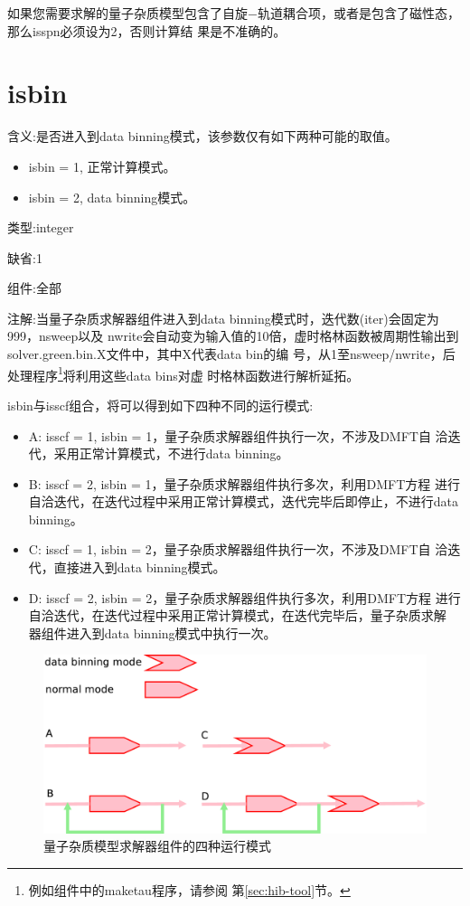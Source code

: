 如果您需要求解的量子杂质模型包含了自旋$-$轨道耦合项，或者是包含了磁性态，那么isspn必须设为2，否则计算结
果是不准确的。

\section{isbin }
\label{sec:isbin}

{\color{red}含义}:是否进入到data binning模式，该参数仅有如下两种可能的取值。
\begin{itemize}
\item isbin = 1, 正常计算模式。
\item isbin = 2, data binning模式。
\end{itemize}

{\color{green}类型}:integer

{\color{blue}缺省}:1

{\color{brown}组件}:全部

{\color{purple}注解}:当量子杂质求解器组件进入到data binning模式时，迭代数(iter)会固定为999，nsweep以及
nwrite会自动变为输入值的10倍，虚时格林函数被周期性输出到solver.green.bin.X文件中，其中X代表data bin的编
号，从1至nsweep/nwrite，后处理程序\footnote{例如{\hibiscus}组件中的maketau程序，请参阅
第\ref{sec:hib-tool}节。}将利用这些data bins对虚
时格林函数进行解析延拓。

isbin与isscf组合，将可以得到如下四种不同的运行模式:

\begin{itemize}
\item A: isscf = 1, isbin = 1，量子杂质求解器组件执行一次，不涉及DMFT自
洽迭代，采用正常计算模式，不进行data binning。
\item B: isscf = 2, isbin = 1，量子杂质求解器组件执行多次，利用DMFT方程
进行自洽迭代，在迭代过程中采用正常计算模式，迭代完毕后即停止，不进行data binning。
\item C: isscf = 1, isbin = 2，量子杂质求解器组件执行一次，不涉及DMFT自
洽迭代，直接进入到data binning模式。
\item D: isscf = 2, isbin = 2，量子杂质求解器组件执行多次，利用DMFT方程
进行自洽迭代，在迭代过程中采用正常计算模式，在迭代完毕后，量子杂质求解
器组件进入到data binning模式中执行一次。
\end{itemize}

\begin{figure}
\centering
\includegraphics[scale=0.20]{figure/flow.eps}
\caption{量子杂质模型求解器组件的四种运行模式} 
\label{fig:flow}
\end{figure}

